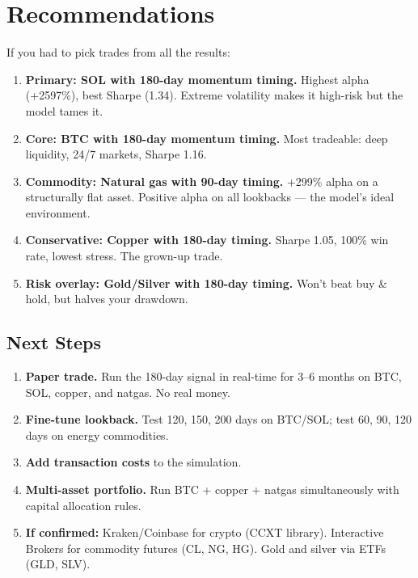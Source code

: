 \documentclass[11pt,a4paper]{article}
\begin{document}
\section{Recommendations}

If you had to pick trades from all the results:

\begin{enumerate}[leftmargin=2em]
    \item \textbf{Primary: SOL with 180-day momentum timing.}
          Highest alpha (+2597\%), best Sharpe (1.34). Extreme
          volatility makes it high-risk but the model tames it.
    \item \textbf{Core: BTC with 180-day momentum timing.}
          Most tradeable: deep liquidity, 24/7 markets, Sharpe 1.16.
    \item \textbf{Commodity: Natural gas with 90-day timing.}
          +299\% alpha on a structurally flat asset. Positive alpha
          on all lookbacks --- the model's ideal environment.
    \item \textbf{Conservative: Copper with 180-day timing.}
          Sharpe 1.05, 100\% win rate, lowest stress. The grown-up
          trade.
    \item \textbf{Risk overlay: Gold/Silver with 180-day timing.}
          Won't beat buy \& hold, but halves your drawdown.
\end{enumerate}

\subsection{Next Steps}

\begin{enumerate}[leftmargin=2em]
    \item \textbf{Paper trade.} Run the 180-day signal in real-time
          for 3--6 months on BTC, SOL, copper, and natgas. No real
          money.
    \item \textbf{Fine-tune lookback.} Test 120, 150, 200 days on
          BTC/SOL; test 60, 90, 120 days on energy commodities.
    \item \textbf{Add transaction costs} to the simulation.
    \item \textbf{Multi-asset portfolio.} Run BTC + copper + natgas
          simultaneously with capital allocation rules.
    \item \textbf{If confirmed:} Kraken/Coinbase for crypto (CCXT
          library). Interactive Brokers for commodity futures (CL, NG,
          HG). Gold and silver via ETFs (GLD, SLV).
\end{enumerate}
\end{document}
